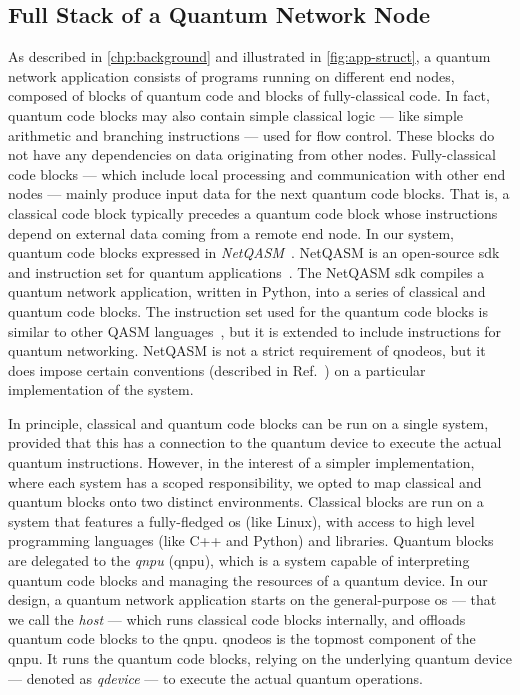 \subsection{Full Stack of a Quantum Network Node}

As described in \cref{chp:background} and illustrated in \cref{fig:app-struct}, a quantum network
application consists of programs running on different end nodes, composed of blocks of quantum code
and blocks of fully-classical code. In fact, quantum code blocks may also contain simple classical
logic --- like simple arithmetic and branching instructions --- used for flow control. These blocks
do not have any dependencies on data originating from other nodes. Fully-classical code blocks ---
which include local processing and communication with other end nodes --- mainly produce input data
for the next quantum code blocks. That is, a classical code block typically precedes a quantum code
block whose instructions depend on external data coming from a remote end node. In our system,
quantum code blocks expressed in \emph{NetQASM}~\cite{dahlberg_2022_netqasm}. NetQASM is an
open-source \acrfull{sdk} and instruction set for quantum applications~\cite{netqasm_sdk}. The
NetQASM \acrshort{sdk} compiles a quantum network application, written in Python, into a series of
classical and quantum code blocks. The instruction set used for the quantum code blocks is similar
to other QASM languages~\cite{cross_2017_qasm, khammassi_2018_cqasm, fu_2019_eqasm}, but it is
extended to include instructions for quantum networking. NetQASM is not a strict requirement of
\acrshort{qnodeos}, but it does impose certain conventions (described in
Ref.~\cite{dahlberg_2022_netqasm}) on a particular implementation of the system.

In principle, classical and quantum code blocks can be run on a single system, provided that this
has a connection to the quantum device to execute the actual quantum instructions. However, in the
interest of a simpler implementation, where each system has a scoped responsibility, we opted to map
classical and quantum blocks onto two distinct environments. Classical blocks are run on a system
that features a fully-fledged \acrshort{os} (like Linux), with access to high level programming
languages (like C++ and Python) and libraries. Quantum blocks are delegated to the
\emph{\acrlong{qnpu}} (\acrshort{qnpu}), which is a system capable of interpreting quantum code
blocks and managing the resources of a quantum device. In our design, a quantum network application
starts on the general-purpose \acrshort{os} --- that we call the \emph{host} --- which runs
classical code blocks internally, and offloads quantum code blocks to the \acrshort{qnpu}.
\acrshort{qnodeos} is the topmost component of the \acrshort{qnpu}. It runs the quantum code blocks,
relying on the underlying quantum device --- denoted as \emph{\acrshort{qdevice}} --- to execute the
actual quantum operations.

